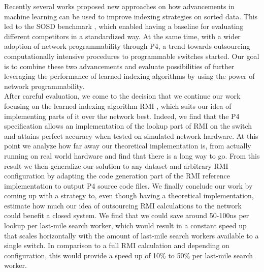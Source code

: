 Recently several works proposed new approaches on how advancements in machine learning can be used to improve indexing strategies on sorted data. This led to the SOSD benchmark \cite{sosd-vldb}, which enabled having a baseline for evaluating different competitors in a standardized way. At the same time, with a wider adoption of network programmability through P4, a trend towards outsourcing computationally intensive procedures to programmable switches started. Our goal is to combine these two advancements and evaluate possibilities of further leveraging the performance of learned indexing algorithms by using the power of network programmability.\\

After careful evaluation, we come to the decision that we continue our work focusing on the learned indexing algorithm RMI \cite{rmi}, which suits our idea of implementing parts of it over the network best. Indeed, we find that the P4 specification \cite{p4-spec} allows an implementation of the lookup part of RMI on the switch and attains perfect accuracy when tested on simulated network hardware. At this point we analyze how far away our theoretical implementation is, from actually running on real world hardware and find that there is a long way to go. From this result we then generalize our solution to any dataset and arbitrary RMI configuration by adapting the code generation part of the RMI reference implementation \cite{cdfshop} to output P4 source code files. We finally conclude our work by coming up with a strategy to, even though having a theoretical implementation, estimate how much our idea of outsourcing RMI calculations to the network could benefit a closed system. We find that we could save around 50-100ns per lookup per last-mile search worker, which would result in a constant speed up that scales horizontally with the amount of last-mile search workers available to a single switch. In comparison to a full RMI calculation and depending on configuration, this would provide a speed up of 10\% to 50\% per last-mile search worker.

